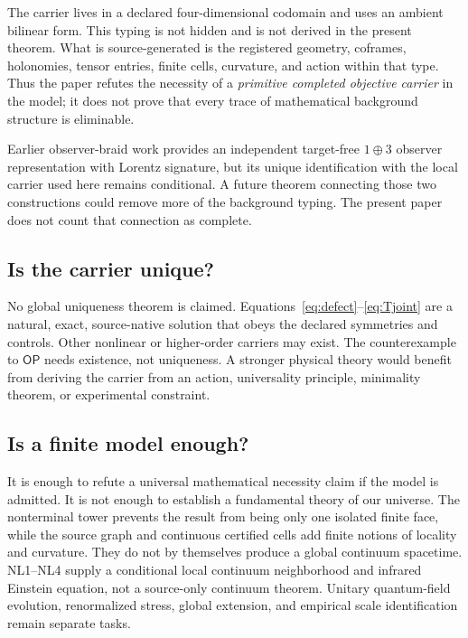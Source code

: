 \documentclass[11pt]{article}
\theoremstyle{definition}
\theoremstyle{remark}
\newcommand{\OPT}{\mathsf{OP}}
\begin{document}
The carrier lives in a declared four-dimensional codomain and uses an ambient bilinear form. This typing is not hidden and is not derived in the present theorem. What is source-generated is the registered geometry, coframes, holonomies, tensor entries, finite cells, curvature, and action within that type. Thus the paper refutes the necessity of a \emph{primitive completed objective carrier} in the model; it does not prove that every trace of mathematical background structure is eliminable.

Earlier observer-braid work provides an independent target-free $1\oplus3$ observer representation with Lorentz signature, but its unique identification with the local carrier used here remains conditional. A future theorem connecting those two constructions could remove more of the background typing. The present paper does not count that connection as complete.

\subsection{Is the carrier unique?}

No global uniqueness theorem is claimed. Equations~\eqref{eq:defect}--\eqref{eq:Tjoint} are a natural, exact, source-native solution that obeys the declared symmetries and controls. Other nonlinear or higher-order carriers may exist. The counterexample to $\OPT$ needs existence, not uniqueness. A stronger physical theory would benefit from deriving the carrier from an action, universality principle, minimality theorem, or experimental constraint.

\subsection{Is a finite model enough?}

It is enough to refute a universal mathematical necessity claim if the model is admitted. It is not enough to establish a fundamental theory of our universe. The nonterminal tower prevents the result from being only one isolated finite face, while the source graph and continuous certified cells add finite notions of locality and curvature. They do not by themselves produce a global continuum spacetime. NL1--NL4 supply a conditional local continuum neighborhood and infrared Einstein equation, not a source-only continuum theorem. Unitary quantum-field evolution, renormalized stress, global extension, and empirical scale identification remain separate tasks.
\end{document}
